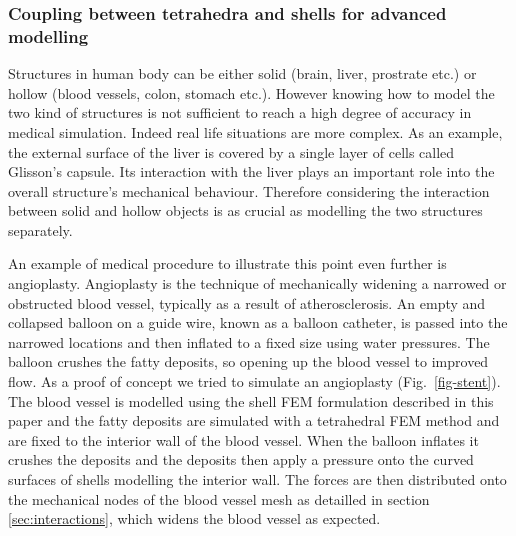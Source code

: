 \documentclass{llncs}
\begin{document}
\subsubsection{Coupling between tetrahedra and shells for advanced modelling}

Structures in human body can be either solid (brain, liver, prostrate etc.) or hollow (blood vessels, colon, stomach etc.). However knowing how to model the two kind of structures is not sufficient to reach a high degree of accuracy in medical simulation. Indeed real life situations are more complex. As an example, the external surface of the liver is covered by a single layer of cells called Glisson's capsule. Its interaction with the liver plays an important role into the overall structure's mechanical behaviour. Therefore considering the interaction between solid and hollow objects is as crucial as modelling the two structures separately. 

An example of medical procedure to illustrate this point even further is angioplasty. Angioplasty is the technique of mechanically widening a narrowed or obstructed blood vessel, typically as a result of atherosclerosis. An empty and collapsed balloon on a guide wire, known as a balloon catheter, is passed into the narrowed locations and then inflated to a fixed size using water pressures. The balloon crushes the fatty deposits, so opening up the blood vessel to improved flow. As a proof of concept we tried to simulate an angioplasty (Fig.~\ref{fig-stent}). The blood vessel is modelled using the shell FEM formulation described in this paper and the fatty deposits are simulated with a tetrahedral FEM method and are fixed to the interior wall of the blood vessel. When the balloon inflates it crushes the deposits and the deposits then apply a pressure onto the curved surfaces of shells modelling the interior wall. The forces are then distributed onto the mechanical nodes of the blood vessel mesh as detailled in section \ref{sec:interactions}, which widens the blood vessel as expected. 
\end{document}
